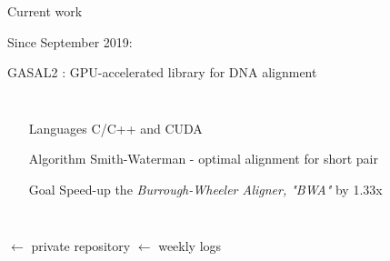 
\begin{frame}{Current work}

	\begin{center}
		Since September 2019:
		
		GASAL2 : GPU-accelerated library for DNA alignment
	
	\begin{columns}
		\begin{itemize}
			\item[Languages] C/C++ and CUDA
			\item[Algorithm] Smith-Waterman - optimal alignment for short pair
			\item[Goal] Speed-up the \emph{Burrough-Wheeler Aligner, "BWA"} by 1.33x
		\end{itemize}	
	\end{columns}

	\bigskip
	\end{center}
	 $\leftarrow$ private repository
	 $\leftarrow$ weekly logs
	
\end{frame}